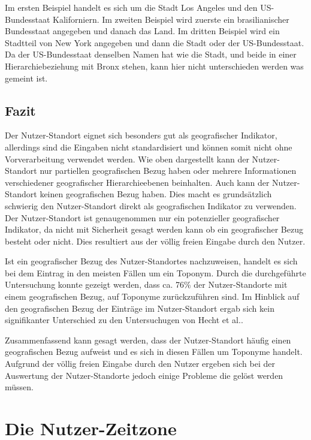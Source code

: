 			Im ersten Beispiel handelt es sich um die Stadt Los Angeles und den US-Bundesstaat Kaliforniern.
			Im zweiten Beispiel wird zuerste ein brasilianischer Bundesstaat angegeben und danach das Land.
			Im dritten Beispiel wird ein Stadtteil von New York angegeben und dann die Stadt oder der US-Bundesstaat. 
			Da der US-Bundesstaat denselben Namen hat wie die Stadt, und beide in einer Hierarchiebeziehung mit Bronx stehen, kann hier nicht unterschieden werden was gemeint ist.
			

		\subsection{Fazit}

			Der Nutzer-Standort eignet sich besonders gut als geografischer Indikator, allerdings sind die Eingaben nicht standardisiert und können somit nicht ohne Vorverarbeitung verwendet werden.
			Wie oben dargestellt kann der Nutzer-Standort nur partiellen geografischen Bezug haben oder mehrere Informationen verschiedener geografischer Hierarchieebenen beinhalten. 
			Auch kann der Nutzer-Standort keinen geografischen Bezug haben.
			Dies macht es grundsätzlich schwierig den Nutzer-Standort direkt als geografischen Indikator zu verwenden.
			Der Nutzer-Standort ist genaugenommen nur ein potenzieller geografischer Indikator, da nicht mit Sicherheit gesagt werden kann ob ein geografischer Bezug besteht oder nicht.
			Dies resultiert aus der völlig freien Eingabe durch den Nutzer.
			
			Ist ein geografischer Bezug des Nutzer-Standortes nachzuweisen, handelt es sich bei dem Eintrag in den meisten Fällen um ein Toponym.
			Durch die durchgeführte Untersuchung konnte gezeigt werden, dass ca. 76\% der Nutzer-Standorte mit einem geografischen Bezug, auf Toponyme zurückzuführen sind.
			Im Hinblick auf den geografischen Bezug der Einträge im Nutzer-Standort ergab sich kein signifikanter Unterschied zu den Untersuchugen von Hecht et al..

			Zusammenfassend kann gesagt werden, dass der Nutzer-Standort häufig einen geografischen Bezug aufweist und es sich in diesen Fällen um Toponyme handelt.
			Aufgrund der völlig freien Eingabe durch den Nutzer ergeben sich bei der Auswertung der Nutzer-Standorte jedoch einige Probleme die gelöst werden müssen.

	\section{Die Nutzer-Zeitzone}

